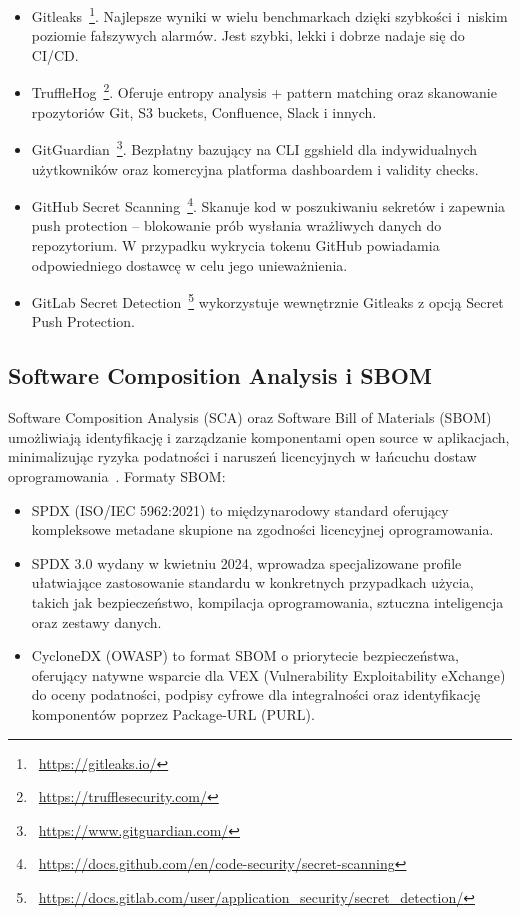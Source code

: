 \begin{itemize}
\item Gitleaks~\footnote{~\url{https://gitleaks.io/}}. Najlepsze wyniki w wielu benchmarkach dzięki szybkości i~niskim poziomie fałszywych alarmów. Jest szybki, lekki i dobrze nadaje się do CI/CD.

\item TruffleHog~\footnote{~\url{https://trufflesecurity.com/}}. Oferuje entropy analysis + pattern matching oraz skanowanie rpozytoriów Git, S3 buckets, Confluence, Slack i innych. 

\item GitGuardian~\footnote{~\url{https://www.gitguardian.com/}}. Bezpłatny bazujący na CLI ggshield dla indywidualnych użytkowników oraz komercyjna platforma dashboardem i validity checks.

\item GitHub Secret Scanning~\footnote{~\url{https://docs.github.com/en/code-security/secret-scanning}}. Skanuje kod w poszukiwaniu sekretów i zapewnia push protection – blokowanie prób wysłania wrażliwych danych do repozytorium. W przypadku wykrycia tokenu GitHub powiadamia odpowiedniego dostawcę w celu jego unieważnienia. 

\item GitLab Secret Detection~\footnote{~\url{https://docs.gitlab.com/user/application_security/secret_detection/}} wykorzystuje wewnętrznie Gitleaks z opcją Secret Push Protection.
\end{itemize}

\subsection{Software Composition Analysis i SBOM}

Software Composition Analysis (SCA) oraz Software Bill of Materials (SBOM) umożliwiają identyfikację i zarządzanie komponentami open source w aplikacjach, minimalizując ryzyka podatności i naruszeń licencyjnych w łańcuchu dostaw oprogramowania~\cite{Prana2021}. Formaty SBOM:
\begin{itemize}
\item SPDX (ISO/IEC 5962:2021) to międzynarodowy standard oferujący kompleksowe metadane skupione na zgodności licencyjnej oprogramowania.
\item SPDX 3.0 wydany w kwietniu 2024, wprowadza specjalizowane profile ułatwiające zastosowanie standardu w konkretnych przypadkach użycia, takich jak bezpieczeństwo, kompilacja oprogramowania, sztuczna inteligencja oraz zestawy danych.
\item CycloneDX (OWASP) to format SBOM o priorytecie bezpieczeństwa, oferujący natywne wsparcie dla VEX (Vulnerability Exploitability eXchange) do oceny podatności, podpisy cyfrowe dla integralności oraz identyfikację komponentów poprzez Package-URL (PURL).
\end{itemize}

